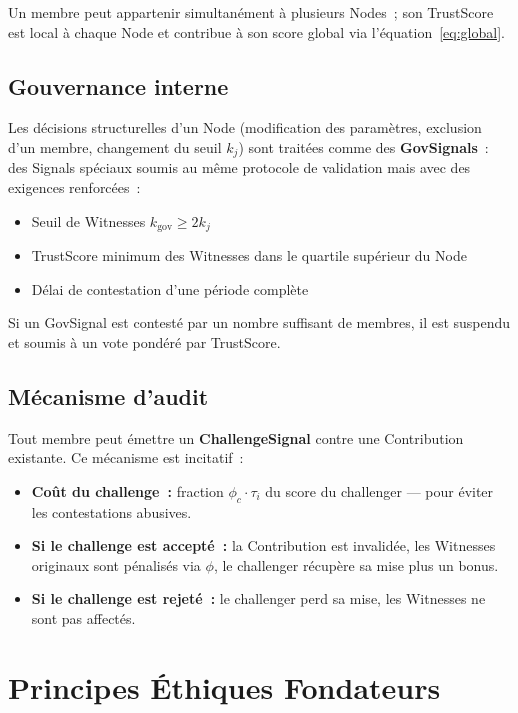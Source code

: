 \documentclass[12pt,a4paper]{article}
\theoremstyle{definition}
\theoremstyle{plain}
\theoremstyle{remark}
\newcommand{\trustscore}{\tau}
\newcommand{\1}{\mathbf{1}}
\begin{document}
Un membre peut appartenir simultanément à plusieurs Nodes~; son TrustScore
est local à chaque Node et contribue à son score global via
l'équation~\eqref{eq:global}.

\subsection{Gouvernance interne}

Les décisions structurelles d'un Node (modification des paramètres, exclusion
d'un membre, changement du seuil $k_j$) sont traitées comme des
\textbf{GovSignals}~: des Signals spéciaux soumis au même protocole de
validation mais avec des exigences renforcées~:

\begin{itemize}
  \item Seuil de Witnesses $k_{\text{gov}} \geq 2 k_j$
  \item TrustScore minimum des Witnesses dans le quartile supérieur du Node
  \item Délai de contestation d'une période complète
\end{itemize}

Si un GovSignal est contesté par un nombre suffisant de membres, il est
suspendu et soumis à un vote pondéré par TrustScore.

\subsection{Mécanisme d'audit}

Tout membre peut émettre un \textbf{ChallengeSignal} contre une Contribution
existante. Ce mécanisme est incitatif~:

\begin{itemize}
  \item \textbf{Coût du challenge~:} fraction $\phi_c \cdot \trustscore_i$
    du score du challenger --- pour éviter les contestations abusives.
  \item \textbf{Si le challenge est accepté~:} la Contribution est invalidée,
    les Witnesses originaux sont pénalisés via $\phi$, le challenger récupère
    sa mise plus un bonus.
  \item \textbf{Si le challenge est rejeté~:} le challenger perd sa mise, les
    Witnesses ne sont pas affectés.
\end{itemize}

\section{Principes Éthiques Fondateurs}
\label{sec:ethique}
\end{document}

